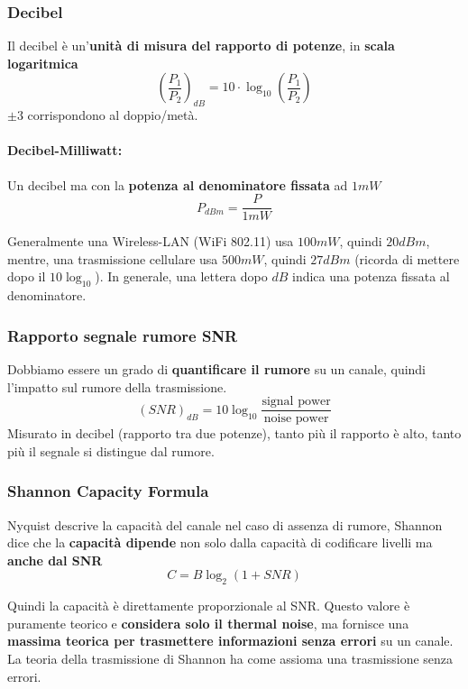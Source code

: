 \newpage

\subsubsection{Decibel}
Il decibel è un'\textbf{unità di misura del rapporto di potenze}, in \textbf{scala logaritmica}
$$ \left(\frac{P_1}{P_2}\right)_{dB} = 10 \cdot \log_{10} \left(\frac{P_1}{P_2}\right) $$ 
$\pm 3$ corrispondono al doppio/metà.\\

\paragraph{Decibel-Milliwatt:} Un decibel ma con la \textbf{potenza al denominatore fissata} ad $1mW$
$$ P_{dBm} = \frac{P}{1mW} $$

Generalmente una Wireless-LAN (WiFi 802.11) usa $100mW$, quindi $20dBm$, mentre, una trasmissione cellulare usa $500mW$, quindi $27dBm$ (ricorda di mettere dopo il $10 \log_{10}$). In generale, una lettera dopo $dB$ indica una potenza fissata al denominatore.\\

\subsubsection{Rapporto segnale rumore SNR}
Dobbiamo essere un grado di \textbf{quantificare il rumore} su un canale, quindi l'impatto sul rumore della trasmissione.
$$  (SNR)_{dB} = 10 \log_{10} \frac{\text{signal power}}{\text{noise power}} $$
Misurato in decibel (rapporto tra due potenze), tanto più il rapporto è alto, tanto più il segnale si distingue dal rumore.\\

\newpage

\subsubsection{Shannon Capacity Formula}
Nyquist descrive la capacità del canale nel caso di assenza di rumore, Shannon dice che la \textbf{capacità dipende} non solo dalla capacità di codificare livelli ma \textbf{anche dal SNR}
$$ C = B \log_2 (1 + SNR) $$

Quindi la capacità è direttamente proporzionale al SNR. Questo valore è puramente teorico e \textbf{considera solo il thermal noise}, ma fornisce una \textbf{massima teorica per trasmettere informazioni senza errori} su un canale. La teoria della trasmissione di Shannon ha come assioma una trasmissione senza errori.\\

